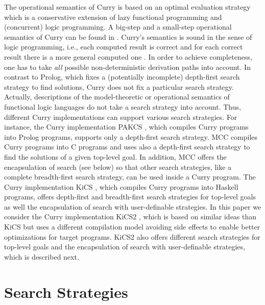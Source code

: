 \documentclass[english]{lni}
\begin{document}
The operational semantics of Curry is based on an optimal evaluation strategy
\cite{AntoyEchahedHanus00JACM} which is a conservative extension
of lazy functional programming and (concurrent) logic programming.
A big-step and a small-step operational semantics of Curry
can be found in \cite{AlbertHanusHuchOliverVidal05}.
Curry's semantics is sound in the sense of logic programming,
i.e., each computed result is correct and for each
correct result there is a more general computed one
\cite{AntoyEchahedHanus00JACM}.
In order to achieve completeness,
one has to take \emph{all} possible non-deterministic derivation paths
into account. In contrast to Prolog, which fixes
a (potentially incomplete) depth-first search strategy to find solutions,
Curry does not fix a particular search strategy.
Actually, descriptions of the model-theoretic \cite{GonzalezEtAl99}
or operational \cite{AlbertHanusHuchOliverVidal05}
semantics of functional logic languages do not take
a search strategy into account.
Thus, different Curry implementations
can support various search strategies.
For instance, the Curry implementation PAKCS \cite{Hanus10PAKCS},
which compiles Curry programs into Prolog programs,
supports only a depth-first search strategy.
MCC \cite{Lux99FLOPS} compiles Curry programs into C programs
and uses also a depth-first search strategy to find the
solutions of a given top-level goal.
In addition, MCC offers the encapsulation of search
(see below) so that other search strategies,
like a complete breadth-first search strategy, can be used
inside a Curry program.
The Curry implementation KiCS \cite{BrasselHuch07,BrasselHuch09},
which compiles Curry programs into Haskell programs,
offers depth-first and breadth-first search strategies
for top-level goals as well the encapsulation of search
with user-definable strategies.
In this paper we consider the Curry implementation
KiCS2 \cite{BrasselHanusPeemoellerReck11},
which is based on similar ideas than KiCS but uses
a different compilation model avoiding side effects
to enable better optimizations for target programs.
KiCS2 also offers different search strategies for top-level goals
and the encapsulation of search with user-definable strategies,
which is described next.


\section{Search Strategies}
\label{sec:strategies}
\end{document}
